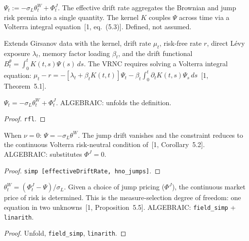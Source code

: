 \begin{defn}\label{def:effectiveDriftRate}
\leanok
{}
$\Psi_t := -\sigma_L \theta_t^W + \Phi_t^J$. The effective drift rate aggregates the Brownian and jump risk premia into a single quantity. The kernel $K$ couples $\Psi$ across time via a Volterra integral equation~[1, eq.~(5.3)]. Defined, not assumed.
\end{defn}

\begin{defn}\label{def:VRNCData}
\leanok
{}
Extends Girsanov data with the kernel, drift rate $\mu_t$, risk-free rate $r$, direct L\'evy exposure $\lambda_t$, memory factor loading $\beta_t$, and the drift functional $B_t^\theta = \int_0^t K(t,s)\Psi(s)\,ds$. The VRNC requires solving a Volterra integral equation: $\mu_t - r = -[\lambda_t + \beta_t K(t,t)]\Psi_t - \beta_t \int_0^t \partial_t K(t,s)\Psi_s\,ds$~[1, Theorem~5.1].
\end{defn}

\begin{theorem}\label{thm:VRNC_determines_Psi}
\leanok
{}
$\Psi_t = -\sigma_L \theta_t^W + \Phi_t^J$. ALGEBRAIC: unfolds the definition.
\end{theorem}
\begin{proof}\leanok \texttt{rfl}.\end{proof}

\begin{theorem}\label{thm:VRNC_continuous_recovery}
\leanok
{}
When $\nu = 0$: $\Psi = -\sigma_L \theta^W$. The jump drift vanishes and the constraint reduces to the continuous Volterra risk-neutral condition of~[1, Corollary~5.2]. ALGEBRAIC: substitutes $\Phi^J = 0$.
\end{theorem}
\begin{proof}\leanok \texttt{simp [effectiveDriftRate, hno\_jumps]}.\end{proof}

\begin{theorem}\label{thm:continuous_from_jump_choice}
\leanok
{}
$\theta^W_t = (\Phi^J_t - \Psi) / \sigma_L$. Given a choice of jump pricing ($\Phi^J$), the continuous market price of risk is determined. This is the measure-selection degree of freedom: one equation in two unknowns~[1, Proposition~5.5]. ALGEBRAIC: \texttt{field\_simp} + \texttt{linarith}.
\end{theorem}
\begin{proof}\leanok Unfold, \texttt{field\_simp}, \texttt{linarith}.\end{proof}

